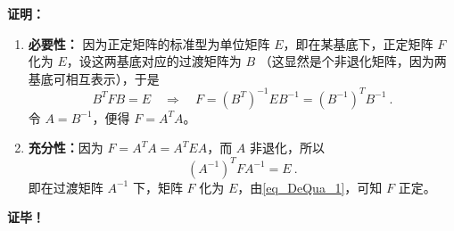 \textbf{证明：}
\begin{enumerate}
\item \textbf{必要性：}
因为正定矩阵的标准型为单位矩阵 $E$，即在某基底下，正定矩阵 $F$ 化为 $E$，设这两基底对应的过渡矩阵为 $B$ （这显然是个非退化矩阵，因为两基底可相互表示），于是
\begin{equation}
B^TFB=E\quad\Rightarrow\quad F={(B^T)}^{-1}EB^{-1}={(B^{-1})}^TB^{-1}~.
\end{equation}
令 $A=B^{-1}$，便得 $F=A^TA$。
\item \textbf{充分性：}因为 $F=A^TA=A^TEA$，而 $A$ 非退化，所以
\begin{equation}
{(A^{-1})}^TFA^{-1}=E~.
\end{equation}
即在过渡矩阵 $A^{-1}$ 下，矩阵 $F$ 化为 $E$，由\autoref{eq_DeQua_1}，可知 $F$ 正定。
\end{enumerate}
\textbf{证毕！}
